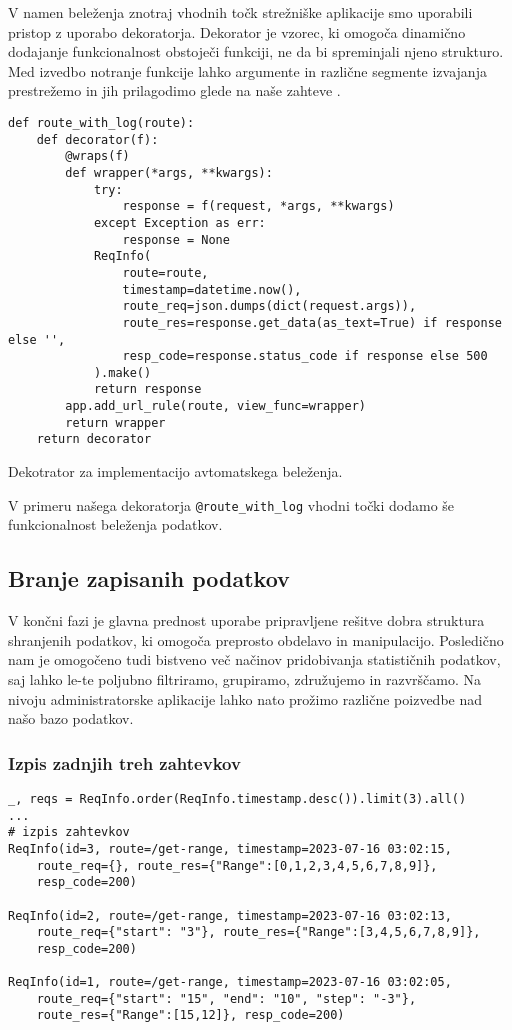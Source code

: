 \documentclass[a4paper,12pt,openright]{book}
\begin{document}
    V namen beleženja znotraj vhodnih točk strežniške aplikacije smo uporabili pristop z uporabo dekoratorja.
    Dekorator je vzorec,  ki omogoča dinamično dodajanje funkcionalnost obstoječi funkciji, ne da bi spreminjali njeno strukturo. Med izvedbo notranje funkcije lahko argumente in različne segmente izvajanja prestrežemo in jih prilagodimo glede na naše zahteve \cite{mu2011design}.

\begin{code}
\begin{verbatim}
def route_with_log(route):
    def decorator(f):
        @wraps(f)
        def wrapper(*args, **kwargs):
            try:
                response = f(request, *args, **kwargs)
            except Exception as err:
                response = None
            ReqInfo(
                route=route,
                timestamp=datetime.now(),
                route_req=json.dumps(dict(request.args)),
                route_res=response.get_data(as_text=True) if response else '',
                resp_code=response.status_code if response else 500
            ).make()
            return response
        app.add_url_rule(route, view_func=wrapper)
        return wrapper
    return decorator
\end{verbatim}
\caption{Dekotrator za implementacijo avtomatskega beleženja.}
\label{log_decorator}
\end{code}

    \noindent
    V primeru našega dekoratorja {\tt @route\_with\_log} vhodni točki dodamo še funkcionalnost beleženja podatkov.

    \subsection{Branje zapisanih podatkov}

    V končni fazi je glavna prednost uporabe pripravljene rešitve dobra struktura shranjenih podatkov, ki omogoča preprosto obdelavo in manipulacijo. Posledično nam je omogočeno tudi bistveno več načinov pridobivanja statističnih podatkov, saj lahko le-te poljubno filtriramo, grupiramo, združujemo in razvrščamo. Na nivoju administratorske aplikacije lahko nato prožimo različne poizvedbe nad našo bazo podatkov.

    \subsubsection{Izpis zadnjih treh zahtevkov}

\begin{verbatim}
_, reqs = ReqInfo.order(ReqInfo.timestamp.desc()).limit(3).all()
... 
# izpis zahtevkov
ReqInfo(id=3, route=/get-range, timestamp=2023-07-16 03:02:15, 
    route_req={}, route_res={"Range":[0,1,2,3,4,5,6,7,8,9]},
    resp_code=200)
    
ReqInfo(id=2, route=/get-range, timestamp=2023-07-16 03:02:13, 
    route_req={"start": "3"}, route_res={"Range":[3,4,5,6,7,8,9]},
    resp_code=200)
    
ReqInfo(id=1, route=/get-range, timestamp=2023-07-16 03:02:05,
    route_req={"start": "15", "end": "10", "step": "-3"},
    route_res={"Range":[15,12]}, resp_code=200)
\end{verbatim}
\end{document}
